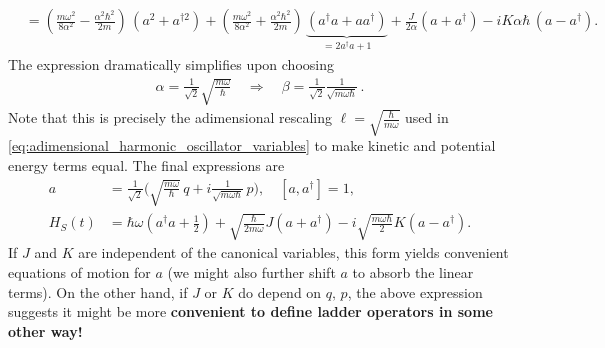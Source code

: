 \documentclass[../QFT_main.tex]{subfiles}
\begin{document}
\begin{mytheorem}
{\begin{align}
    &=\left(\frac{m\omega^2}{8\alpha^2}-\frac{\alpha^2\hbar^2}{2m}\right)\,(a^2+a^{\dagger 2})
    +\left(\frac{m\omega^2}{8\alpha^2}+\frac{\alpha^2\hbar^2}{2m}\right)\,\underbrace{(a^\dagger a+a a^\dagger)}_{=2a^\dagger a +1}
    +\frac{J}{2\alpha}(a+a^\dagger)
    - iK\alpha\hbar\,(a-a^\dagger).  
\end{align}}
The expression dramatically simplifies upon choosing
{\small
\begin{align}\label{eq:choosing_alpha_ladder_op}
    \alpha = \tfrac{1}{\sqrt{2}}\sqrt{\tfrac{m\omega}{\hbar}} \quad \Longrightarrow \quad \beta = \tfrac{1}{\sqrt{2}}\tfrac{1}{\sqrt{m \omega \hbar}}\,.
\end{align}}
Note that this is precisely the adimensional rescaling $\ell=\sqrt{\tfrac{\hbar}{m\omega}}$ used in \eqref{eq:adimensional_harmonic_oscillator_variables} to make kinetic and potential energy terms equal.
The final expressions are
{\small
\begin{align}\label{eq:oscillator_hamiltonian_written_ladder_operators}
    a &= \frac{1}{\sqrt{2}}\Big(\sqrt{\tfrac{m\omega}{\hbar}}\, q + i \tfrac{1}{\sqrt{m \omega \hbar}}\, p\Big), \quad [a, a^\dagger] = 1,\\[2.5pt]
    H_S(t) &= \hbar \omega \left(a^\dagger a + \tfrac{1}{2}\right) + \sqrt{\frac{\hbar}{2 m \omega}} J (a + a^\dagger) - i \sqrt{\frac{m \omega \hbar}{2}} K (a - a^\dagger).
\end{align}}
If $J$ and $K$ are independent of the canonical variables, this form yields convenient equations of motion for $a$ (we might also further shift $a$ to absorb the linear terms).
On the other hand, if $J$ or $K$ do depend on $q,\,p$, the above expression suggests it might be more \textbf{convenient to define ladder operators in some other way!}


\end{mytheorem}
\end{document}
